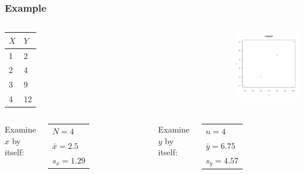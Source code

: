 \begin{frame}
  \frametitle{Example}

  \begin{columns}

    \begin{tabular}{l|l}
      $X$ & $Y$ \\ \hline
      1 & 2 \\
      2 & 4  \\
      3 & 9 \\
      4 & 12
    \end{tabular}


    \vfill


    {
      \includegraphics[width=4cm]{img/simpleCorrelationExample}
    }

    \vfill

  \end{columns}


  \begin{columns}

     {

      Examine $x$ by itself: \\
      \begin{tabular}{l}
        $N=4$ \\
        $\bar{x}=2.5$ \\
        $s_x=1.29$
      \end{tabular}


    }
      


     {

      Examine $y$ by itself: \\
      \begin{tabular}{l}
        $n=4$ \\
        $\bar{y}=6.75$ \\
        $s_y=4.57$
      \end{tabular}



    }


  \end{columns}


\end{frame}

